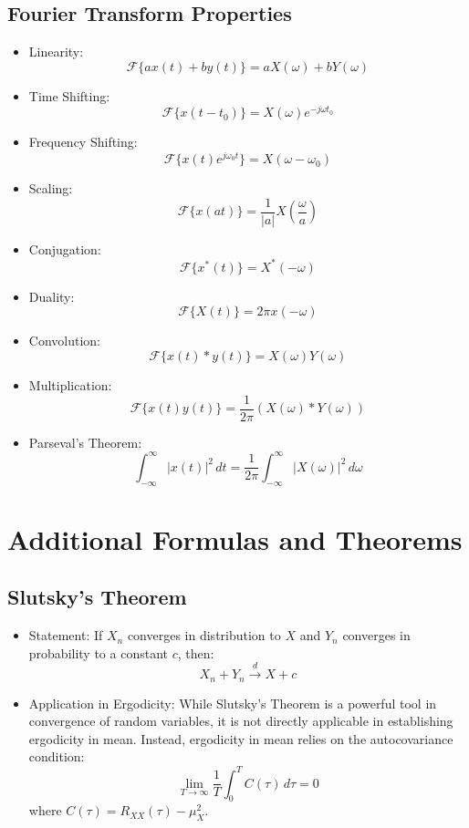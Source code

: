 \documentclass[12pt]{article}
\begin{document}
\subsection{Fourier Transform Properties}
\begin{itemize}
    \item Linearity:
    \[
    \mathcal{F}\{a x(t) + b y(t)\} = a X(\omega) + b Y(\omega)
    \]
    \item Time Shifting:
    \[
    \mathcal{F}\{x(t - t_0)\} = X(\omega) e^{-j\omega t_0}
    \]
    \item Frequency Shifting:
    \[
    \mathcal{F}\{x(t) e^{j\omega_0 t}\} = X(\omega - \omega_0)
    \]
    \item Scaling:
    \[
    \mathcal{F}\{x(at)\} = \frac{1}{|a|} X\left(\frac{\omega}{a}\right)
    \]
    \item Conjugation:
    \[
    \mathcal{F}\{x^*(t)\} = X^*(-\omega)
    \]
    \item Duality:
    \[
    \mathcal{F}\{X(t)\} = 2\pi x(-\omega)
    \]
    \item Convolution:
    \[
    \mathcal{F}\{x(t) * y(t)\} = X(\omega) Y(\omega)
    \]
    \item Multiplication:
    \[
    \mathcal{F}\{x(t) y(t)\} = \frac{1}{2\pi} \left( X(\omega) * Y(\omega) \right)
    \]
    \item Parseval’s Theorem:
    \[
    \int_{-\infty}^{\infty} |x(t)|^2 \, dt = \frac{1}{2\pi} \int_{-\infty}^{\infty} |X(\omega)|^2 \, d\omega
    \]
\end{itemize}

\section{Additional Formulas and Theorems}

\subsection{Slutsky's Theorem}
\begin{itemize}
    \item Statement: If \( X_n \) converges in distribution to \( X \) and \( Y_n \) converges in probability to a constant \( c \), then:
    \[
    X_n + Y_n \xrightarrow{d} X + c
    \]
    \item Application in Ergodicity: While Slutsky's Theorem is a powerful tool in convergence of random variables, it is not directly applicable in establishing ergodicity in mean. Instead, ergodicity in mean relies on the autocovariance condition:
    \[
    \lim_{T \to \infty} \frac{1}{T} \int_{0}^{T} C(\tau) \, d\tau = 0
    \]
    where \( C(\tau) = R_{XX}(\tau) - \mu_X^2 \).
\end{itemize}
\end{document}

